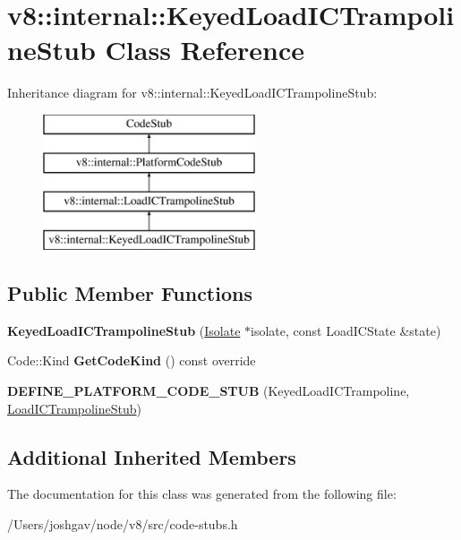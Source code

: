\hypertarget{classv8_1_1internal_1_1_keyed_load_i_c_trampoline_stub}{}\section{v8\+:\+:internal\+:\+:Keyed\+Load\+I\+C\+Trampoline\+Stub Class Reference}
\label{classv8_1_1internal_1_1_keyed_load_i_c_trampoline_stub}
Inheritance diagram for v8\+:\+:internal\+:\+:Keyed\+Load\+I\+C\+Trampoline\+Stub\+:\begin{figure}[H]
\begin{center}
\leavevmode
\includegraphics[height=4.000000cm]{classv8_1_1internal_1_1_keyed_load_i_c_trampoline_stub}
\end{center}
\end{figure}
\subsection*{Public Member Functions}
\begin{DoxyCompactItemize}
\item 
{\bfseries Keyed\+Load\+I\+C\+Trampoline\+Stub} (\hyperlink{classv8_1_1internal_1_1_isolate}{Isolate} $\ast$isolate, const Load\+I\+C\+State \&state)\hypertarget{classv8_1_1internal_1_1_keyed_load_i_c_trampoline_stub_a6a86ab9935aae093fd6813bca6ff0e7c}{}\label{classv8_1_1internal_1_1_keyed_load_i_c_trampoline_stub_a6a86ab9935aae093fd6813bca6ff0e7c}

\item 
Code\+::\+Kind {\bfseries Get\+Code\+Kind} () const  override\hypertarget{classv8_1_1internal_1_1_keyed_load_i_c_trampoline_stub_ae7620bd87f36166ece1a2521c6bd1f13}{}\label{classv8_1_1internal_1_1_keyed_load_i_c_trampoline_stub_ae7620bd87f36166ece1a2521c6bd1f13}

\item 
{\bfseries D\+E\+F\+I\+N\+E\+\_\+\+P\+L\+A\+T\+F\+O\+R\+M\+\_\+\+C\+O\+D\+E\+\_\+\+S\+T\+UB} (Keyed\+Load\+I\+C\+Trampoline, \hyperlink{classv8_1_1internal_1_1_load_i_c_trampoline_stub}{Load\+I\+C\+Trampoline\+Stub})\hypertarget{classv8_1_1internal_1_1_keyed_load_i_c_trampoline_stub_aea5a280e20762cd83ad79e00b6fca04d}{}\label{classv8_1_1internal_1_1_keyed_load_i_c_trampoline_stub_aea5a280e20762cd83ad79e00b6fca04d}

\end{DoxyCompactItemize}
\subsection*{Additional Inherited Members}


The documentation for this class was generated from the following file\+:\begin{DoxyCompactItemize}
\item 
/\+Users/joshgav/node/v8/src/code-\/stubs.\+h\end{DoxyCompactItemize}
